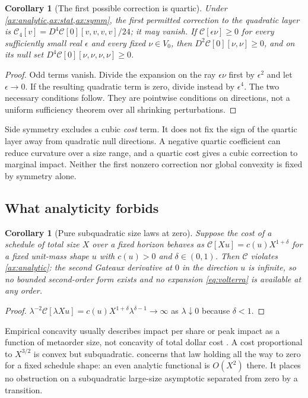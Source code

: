 \documentclass[11pt]{article}
\numberwithin{equation}{section}
\newtheorem{corollary}[theorem]{Corollary}
\theoremstyle{definition}
\theoremstyle{remark}
\theoremstyle{definition}
\begin{document}
\begin{corollary}[The first possible correction is quartic]\label{cor:quartic}
Under \cref{ax:analytic,ax:stat,ax:symm}, the first permitted correction to
the quadratic layer is
$\mathcal C_4[v]=D^4\mathcal C[0][v,v,v,v]/24$; it may vanish.
If $\mathcal C[\epsilon\nu]\ge0$ for every sufficiently small real
$\epsilon$ and every fixed $\nu\in V_0$, then
$D^2\mathcal C[0][\nu,\nu]\ge0$, and on its null set
$D^4\mathcal C[0][\nu,\nu,\nu,\nu]\ge0$.
\end{corollary}
\begin{proof}
Odd terms vanish. Divide the expansion on the ray $\epsilon\nu$ first by
$\epsilon^2$ and let $\epsilon\to0$. If the resulting quadratic term is
zero, divide instead by $\epsilon^4$. The two necessary conditions follow.
They are pointwise conditions on directions, not a uniform sufficiency theorem
over all shrinking perturbations.
\end{proof}

Side symmetry excludes a cubic \emph{cost} term. It does not fix the sign
of the quartic layer away from quadratic null directions. A negative quartic
coefficient can reduce curvature over a size range, and a quartic cost gives a
cubic correction to marginal impact. Neither the first nonzero correction nor
global convexity is fixed by symmetry alone.

\subsection{What analyticity forbids}
\begin{corollary}[Pure subquadratic size laws at zero]\label{cor:nonanalytic}
Suppose the cost of a schedule of total size $X$ over a fixed horizon behaves
as $\mathcal C[Xu]=c(u)X^{1+\delta}$ for a fixed unit-mass shape $u$ with
$c(u)>0$ and $\delta\in(0,1)$. Then $\mathcal C$ violates
\cref{ax:analytic}: the second Gateaux derivative at $0$ in the direction $u$
is infinite, so no bounded second-order form exists and no expansion
\eqref{eq:volterra} is available at any order.
\end{corollary}
\begin{proof}
$\lambda^{-2}\mathcal C[\lambda Xu]=c(u)X^{1+\delta}\lambda^{\delta-1}\to\infty$
as $\lambda\downarrow0$ because $\delta<1$.
\end{proof}

Empirical concavity usually describes impact per share or peak impact as a
function of metaorder size, not concavity of total dollar cost
\citep{toth2011,zarinelli2015,bucci2018,bershova2013}. A cost proportional to
$X^{3/2}$ is convex but subquadratic.  concerns that
law holding all the way to zero for a fixed schedule shape: an even analytic
functional is $O(X^2)$ there. It places no obstruction on a subquadratic
large-size asymptotic separated from zero by a transition.
\end{document}
